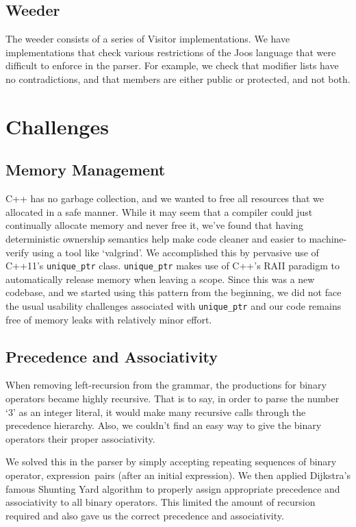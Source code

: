 \documentclass[12pt, titlepage]{article}
\begin{document}
\subsection{Weeder}
The weeder consists of a series of Visitor implementations. We have
implementations that check various restrictions of the Joos language that were
difficult to enforce in the parser. For example, we check that modifier lists
have no contradictions, and that members are either public or protected, and
not both.

\newpage

\section{Challenges}
\subsection{Memory Management}
C++ has no garbage collection, and we wanted to free all resources that we
allocated in a safe manner. While it may seem that a compiler could just
continually allocate memory and never free it, we've found that having
deterministic ownership semantics help make code cleaner and easier to
machine-verify using a tool like `valgrind'. We accomplished this by pervasive
use of C++11's \verb+unique_ptr+ class. \verb+unique_ptr+ makes use of C++'s
RAII paradigm to automatically release memory when leaving a scope. Since this
was a new codebase, and we started using this pattern from the beginning, we
did not face the usual usability challenges associated with \verb+unique_ptr+
and our code remains free of memory leaks with relatively minor effort.

\subsection{Precedence and Associativity}
When removing left-recursion from the grammar, the productions for binary
operators became highly recursive. That is to say, in order to parse the number
`3' as an integer literal, it would make many recursive calls through the
precedence hierarchy. Also, we couldn't find an easy way to give the binary
operators their proper associativity.

We solved this in the parser by simply accepting repeating sequences of \lbrack
binary operator, expression\rbrack\ pairs (after an initial expression). We
then applied Dijkstra's famous Shunting Yard algorithm to properly assign
appropriate precedence and associativity to all binary operators. This limited
the amount of recursion required and also gave us the correct precedence and
associativity.
\end{document}
